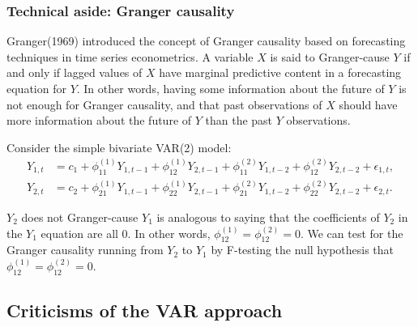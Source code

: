 \subsubsection{Technical aside: Granger causality}

Granger(1969\cite{granger1969investigating}) introduced the concept of Granger causality based on forecasting techniques 
in time series econometrics. A variable $X$ is said to Granger-cause $Y$ if and only if 
lagged values of $X$ have marginal predictive content in a forecasting equation for $Y$.
In other words, having some information about the future of $Y$ is not enough for Granger causality, 
and that past observations of $X$ should have more information about
the future of $Y$ than the past $Y$ observations.

Consider the simple bivariate VAR(2) model:
\begin{align*}
    Y_{1,t} &= c_1 + \phi_{11}^{(1)} Y_{1,t-1} + \phi_{12}^{(1)} Y_{2,t-1} + \phi_{11}^{(2)} Y_{1,t-2} + \phi_{12}^{(2)} Y_{2,t-2} + \epsilon_{1,t}, \\
    Y_{2,t} &= c_2 + \phi_{21}^{(1)} Y_{1,t-1} + \phi_{22}^{(1)} Y_{2,t-1} + \phi_{21}^{(2)} Y_{1,t-2} + \phi_{22}^{(2)} Y_{2,t-2} + \epsilon_{2,t}.
\end{align*}

$Y_2$ does not Granger-cause $Y_1$ is analogous to saying that the coefficients of $Y_2$ in the $Y_1$ equation are all 0. 
In other words, $\phi_{12}^{(1)} = \phi_{12}^{(2)} = 0$. We can test for the Granger causality running from $Y_2$ to $Y_1$ by 
F-testing the null hypothesis that $\phi_{12}^{(1)} = \phi_{12}^{(2)} = 0$.

\subsection{Criticisms of the VAR approach}

